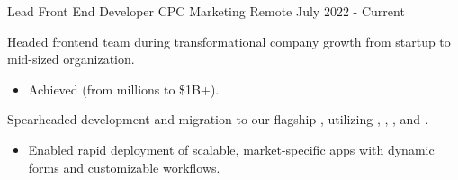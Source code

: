 \begin{cventries}

\cventry
{Lead Front End Developer} %
{CPC Marketing} %
{Remote} %
{July 2022 - Current} %
{
  \begin{cvitems} %
    \item {Headed frontend team during transformational company growth from startup to mid-sized organization.}
    \begin{itemize}[leftmargin=2.5ex, itemsep=.8mm]
      \vspace{.8mm}
      \item {Achieved  (from millions to \$1B+).}
      \vspace{.3mm}
    \end{itemize}
    \item {Spearheaded development and migration to our flagship , utilizing , , , and .}
    \begin{itemize}[leftmargin=2.5ex, itemsep=.8mm]
      \vspace{.8mm}
      \item {Enabled rapid deployment of scalable, market-specific apps with dynamic forms and customizable workflows.}

\end{itemize}
\end{cvitems}}
\end{cventries}
